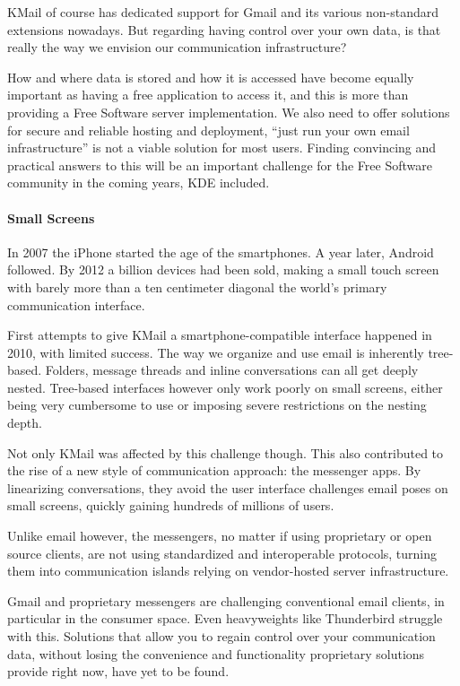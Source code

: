 KMail of course has dedicated support for Gmail and its various non-standard extensions nowadays. But regarding having control over your own data, is that really the way we envision our communication infrastructure?

How and where data is stored and how it is accessed have become equally important as having a free application to access it, and this is more than providing a Free Software server implementation. We also need to offer solutions for secure and reliable hosting and deployment, “just run your own email infrastructure” is not a viable solution for most users. Finding convincing and practical answers to this will be an important challenge for the Free Software community in the coming years, KDE included.

\paragraph{Small Screens}

In 2007 the iPhone started the age of the smartphones. A year later, Android followed. By 2012 a billion devices had been sold, making a small touch screen with barely more than a ten centimeter diagonal the world's primary communication interface.

First attempts to give KMail a smartphone-compatible interface happened in 2010, with limited success. The way we organize and use email is inherently tree-based. Folders, message threads and inline conversations can all get deeply nested. Tree-based interfaces however only work poorly on small screens, either being very cumbersome to use or imposing severe restrictions on the nesting depth.

Not only KMail was affected by this challenge though. This also contributed to the rise of a new style of communication approach: the messenger apps. By linearizing conversations, they avoid the user interface challenges email poses on small screens, quickly gaining hundreds of millions of users.

Unlike email however, the messengers, no matter if using proprietary or open source clients, are not using standardized and interoperable protocols, turning them into communication islands relying on vendor-hosted server infrastructure.

Gmail and proprietary messengers are challenging conventional email clients, in particular in the consumer space. Even heavyweights like Thunderbird struggle with this. Solutions that allow you to regain control over your communication data, without losing the convenience and functionality proprietary solutions provide right now, have yet to be found.

